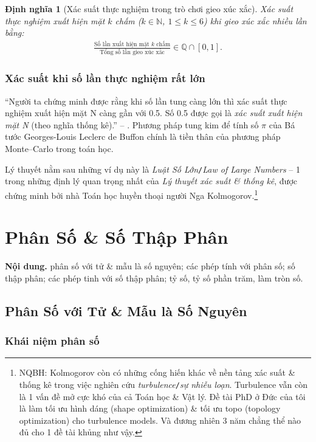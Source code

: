 \documentclass{article}
\numberwithin{equation}{section}
\newtheorem{definition}{Định nghĩa}[section]
\begin{document}
\begin{definition}[Xác suất thực nghiệm trong trò chơi gieo xúc xắc]
	\emph{Xác suất thực nghiệm xuất hiện mặt $k$ chấm} ($k\in\mathbb{N}$, $1\le k\le 6$) khi gieo xúc xắc nhiều lần bằng:
	\begin{align*}
		\frac{\mbox{Số lần xuất hiện mặt $k$ chấm}}{\mbox{Tổng số lần gieo xúc xắc}}\in\mathbb{Q}\cap[0,1].
	\end{align*}
\end{definition}

\subsubsection{Xác suất khi số lần thực nghiệm rất lớn}
``Người ta chứng minh được rằng khi số lần tung càng lớn thì xác suất thực nghiệm xuất hiện mặt N càng gần với 0.5. Số 0.5 được gọi là \textit{xác suất xuất hiện mặt N} (theo nghĩa thống kê).'' -- \cite[p. 21]{Thai_Anh_Dat_Ha_Loan_Nam_Quang_Toan_6_tap_2}. Phương pháp tung kim để tính số $\pi$ của Bá tước Georges-Louis Leclerc de Buffon chính là tiền thân của phương pháp Monte--Carlo trong toán học.

Lý thuyết nằm sau những ví dụ này là \textit{Luật Số Lớn}\texttt{/}\textit{Law of Large Numbers} -- 1 trong những định lý quan trọng nhất của \textit{Lý thuyết xác suất \& thống kê}, được chứng minh bởi nhà Toán học huyền thoại người Nga Kolmogorov.\footnote{NQBH: Kolmogorov còn có những cống hiến khác về nền tảng xác suất \& thống kê trong việc nghiên cứu \textit{turbulence}\texttt{/}\textit{sự nhiễu loạn}. Turbulence vẫn còn là 1 vấn đề mở cực khó của cả Toán học \& Vật lý. Đề tài PhD ở Đức của tôi là làm tối ưu hình dáng (shape optimization) \& tối ưu topo (topology optimization) cho turbulence models. Và đương nhiên 3 năm chẳng thể nào đủ cho 1 đề tài khủng như vậy.}

\section{Phân Số \& Số Thập Phân}
\textbf{Nội dung.} phân số với tử \& mẫu là số nguyên; các phép tính với phân số; số thập phân; các phép tinh với số thập phân; tỷ số, tỷ số phần trăm, làm tròn số.

\subsection{Phân Số với Tử \& Mẫu là Số Nguyên}

\subsubsection{Khái niệm phân số}
\end{document}
